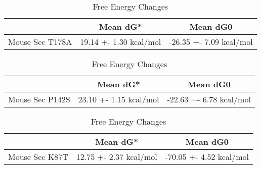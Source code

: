                         \begin{table}[ht]
                            \centering
                            \begin{tabular}{|c|c|c|}
                            \hline
                              & Mean dG* & Mean dG0 \\
                            \hline
                            Mouse Sec  T178A & 19.14 +- 1.30 kcal/mol & -26.35 +- 7.09 kcal/mol \\
                            \hline
                            \end{tabular}
                            \caption{Free Energy Changes}
                            \end{table}
                            
                            \begin{table}[ht]
                              \centering
                              \begin{tabular}{|c|c|c|}
                              \hline
                                & Mean dG* & Mean dG0 \\
                              \hline
                              Mouse Sec P142S & 23.10 +- 1.15 kcal/mol & -22.63 +- 6.78 kcal/mol \\
                              \hline
                              \end{tabular}
                              \caption{Free Energy Changes}
                              \end{table}
                            
                              \begin{table}[ht]
                                \centering
                                \begin{tabular}{|c|c|c|}
                                \hline
                                  & Mean dG* & Mean dG0 \\
                                \hline
                                Mouse Sec K87T & 12.75 +- 2.37 kcal/mol & -70.05 +- 4.52 kcal/mol \\
                                \hline
                                \end{tabular}
                                \caption{Free Energy Changes}
                                \end{table}


